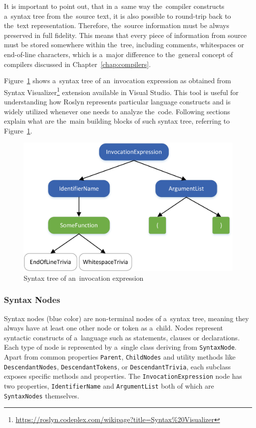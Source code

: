 \documentclass[
  digital, %
  table,   %
  lof,     %
  lot,     %
  oneside,
]{fithesis3}
\begin{document}
It is important to point out, that in a~same way the~compiler constructs a~syntax tree from the~source text, it is also possible to round-trip back to the~text representation. Therefore, the~source information must be always preserved in full fidelity. This means that every piece of information from source must be stored somewhere within the~tree, including comments, whitespaces or end-of-line characters, which is a~major difference to the~general concept of compilers discussed in Chapter~\ref{chap:compilers}.

Figure~\ref{fig:roslyn-syntax-tree} shows a~syntax tree of an~invocation expression as obtained from Syntax Visualizer\footnote{\url{https://roslyn.codeplex.com/wikipage?title=Syntax\%20Visualizer}} extension available in Visual Studio. This tool is useful for understanding how Roslyn represents particular language constructs and is widely utilized whenever one needs to analyze the~code. Following sections explain what are the~main building blocks of such syntax tree, referring to Figure~\ref{fig:roslyn-syntax-tree}.

\begin{figure}[h!]
		\centering
			\includegraphics[scale=0.85]{img/roslyn-syntax-tree}
		\caption{Syntax tree of an~invocation expression}
		\label{fig:roslyn-syntax-tree}
\end{figure}

\subsubsection{\textbf{Syntax Nodes}}
Syntax nodes (blue color) are non-terminal nodes of a~syntax tree, meaning they always have at least one other node or token as a~child. Nodes represent syntactic constructs of a~language such as statements, clauses or declarations. Each type of node is represented by a~single class deriving from \texttt{SyntaxNode}. Apart from common properties \texttt{Parent}, \texttt{ChildNodes} and utility methods like \texttt{DescendantNodes}, \texttt{DescendantTokens}, or \texttt{DescendantTrivia}, each subclass exposes specific methods and properties. The \texttt{InvocationExpression} node has two properties, \texttt{IdentifierName} and \texttt{ArgumentList} both of which are \texttt{SyntaxNodes} themselves.
 
\end{document}
